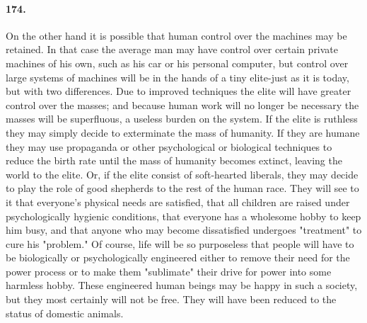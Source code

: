 \documentclass[12pt]{book}
\begin{document}
\paragraph{174.} On the other hand it is possible that human control over the machines may be retained. In that case the average man may have control over certain private machines of his own, such as his car or his personal computer, but control over large systems of machines will be in the hands of a tiny elite-just as it is today, but with two differences. Due to improved techniques the elite will have greater control over the masses; and because human work will no longer be necessary the masses will be superfluous, a useless burden on the system. If the elite is ruthless they may simply decide to exterminate the mass of humanity. If they are humane they may use propaganda or other psychological or biological techniques to reduce the birth rate until the mass of humanity becomes extinct, leaving the world to the elite. Or, if the elite consist of soft-hearted liberals, they may decide to play the role of good shepherds to the rest of the human race. They will see to it that everyone's physical needs are satisfied, that all children are raised under psychologically hygienic conditions, that everyone has a wholesome hobby to keep him busy, and that anyone who may become dissatisfied undergoes "treatment" to cure his "problem." Of course, life will be so purposeless that people will have to be biologically or psychologically engineered either to remove their need for the power process or to make them "sublimate" their drive for power into some harmless hobby. These engineered human beings may be happy in such a society, but they most certainly will not be free. They will have been reduced to the status of domestic animals.
\end{document}
